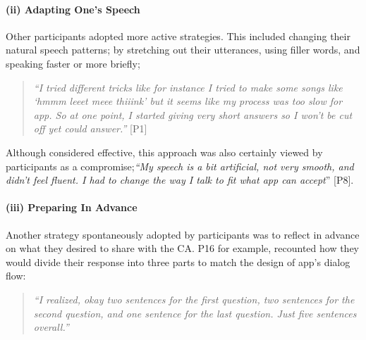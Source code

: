             \paragraph{(ii) Adapting One's Speech}
    
                Other participants adopted more active strategies. This included changing their natural speech patterns; by stretching out their utterances, using filler words, and speaking faster or more briefly;
                
                    \begin{quote}
                    \vspace{2mm}
                        \textit{``I tried different tricks like for instance I tried to make some songs like `hmmm leeet meee thiiink' but it seems like my process was too slow for \acl{app}. So at one point, I started giving very short answers so I won’t be cut off yet could answer.''} [P1]
                    \vspace{2mm}
                    \end{quote}             
                
                Although considered effective, this approach was also certainly viewed by participants as a compromise;\textit{``My speech is a bit artificial, not very smooth, and didn't feel fluent. I had to change the way I talk to fit what \acl{app} can accept}'' [P8].
                    
            \paragraph{(iii) Preparing In Advance}
                    
                Another strategy spontaneously adopted by participants was to reflect in advance on what they desired to share with the \ac{CA}. P16 for example, recounted how they would divide their response into three parts to match the design of \acl{app}'s dialog flow:  
                
                    \begin{quote}
                    \vspace{2mm}
                        \textit{``I realized, okay two sentences for the first question, two sentences for the second question, and one sentence for the last question. Just five sentences overall.''} %
                    \vspace{2mm}
                    \end{quote}   
                
